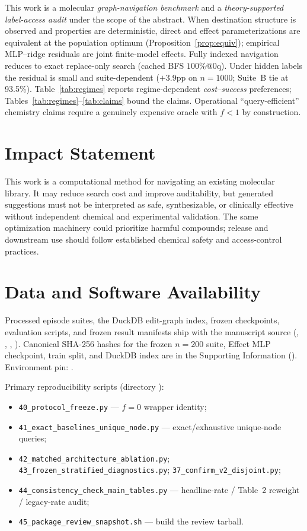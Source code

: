 This work is a molecular \emph{graph-navigation benchmark} and a \emph{theory-supported label-access audit} under the scope of the abstract. When destination structure is observed and properties are deterministic, direct and effect parameterizations are equivalent at the population optimum (Proposition~\ref{prop:equiv}); empirical MLP--ridge residuals are joint finite-model effects. Fully indexed navigation reduces to exact replace-only search (cached BFS $100\%$@$0$q). Under hidden labels the residual is small and suite-dependent ($+3.9$pp on $n{=}1000$; Suite~B tie at 93.5\%). Table~\ref{tab:regimes} reports regime-dependent \emph{cost--success} preferences; Tables~\ref{tab:regimes}--\ref{tab:claims} bound the claims. Operational ``query-efficient'' chemistry claims require a genuinely expensive oracle with $f{<}1$ by construction.

\section*{Impact Statement}

This work is a computational method for navigating an existing molecular library. It may reduce search cost and improve auditability, but generated suggestions must not be interpreted as safe, synthesizable, or clinically effective without independent chemical and experimental validation. The same optimization machinery could prioritize harmful compounds; release and downstream use should follow established chemical safety and access-control practices.

\section*{Data and Software Availability}
Processed episode suites, the DuckDB edit-graph index, frozen checkpoints, evaluation scripts, and frozen result manifests ship with the manuscript source (, , , ). Canonical SHA-256 hashes for the frozen $n{=}200$ suite, Effect MLP checkpoint, train split, and DuckDB index are in the Supporting Information (). Environment pin: .

Primary reproducibility scripts (directory ):
\begin{itemize}
  \item \texttt{40\_protocol\_freeze.py} --- $f{=}0$ wrapper identity;
  \item \texttt{41\_exact\_baselines\_unique\_node.py} --- exact/exhaustive unique-node queries;
  \item \texttt{42\_matched\_architecture\_ablation.py};\\
        \texttt{43\_frozen\_stratified\_diagnostics.py}; \texttt{37\_confirm\_v2\_disjoint.py};
  \item \texttt{44\_consistency\_check\_main\_tables.py} --- headline-rate / Table~2 reweight / legacy-rate audit;
  \item \texttt{45\_package\_review\_snapshot.sh} --- build the review tarball.
\end{itemize}

